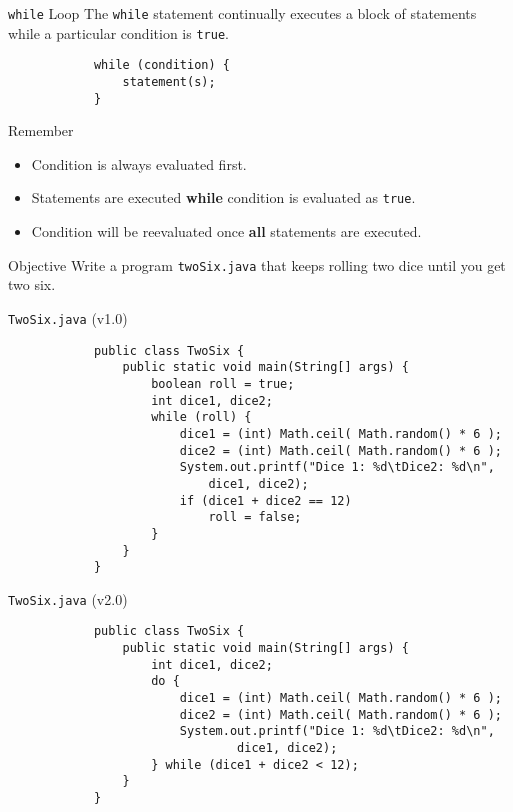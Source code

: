 \documentclass[10pt, compress]{beamer}
\begin{document}
\begin{slide}
	\begin{block}{\texttt{while} Loop}
		The \texttt{while} statement continually executes a block of statements while a particular condition is \texttt{true}.
		\begin{verbatim}
			while (condition) {
			    statement(s);
			}
		\end{verbatim}
	\end{block}
	\begin{block}{Remember}
		\begin{itemize}
			\item[] Condition is always evaluated first.
			\item[] Statements are executed \textbf{while} condition is evaluated as \texttt{true}.
			\item[] Condition will be reevaluated once \textbf{all} statements are executed.
		\end{itemize}
	\end{block}
\end{slide}

\begin{slide}
	\begin{block}{Objective}
		Write a program \texttt{twoSix.java} that keeps rolling two dice until you get two six.
	\end{block}
\end{slide}

\begin{slide}
	\begin{block}{\texttt{TwoSix.java} (v1.0)}
		\begin{verbatim}
			public class TwoSix {
			    public static void main(String[] args) {
			        boolean roll = true;
			        int dice1, dice2;
			        while (roll) {
			            dice1 = (int) Math.ceil( Math.random() * 6 );
			            dice2 = (int) Math.ceil( Math.random() * 6 );
			            System.out.printf("Dice 1: %d\tDice2: %d\n",
			                dice1, dice2);
			            if (dice1 + dice2 == 12)
			                roll = false;
			        }
			    }
			}
		\end{verbatim}
	\end{block}
\end{slide}

\begin{slide}
	\begin{block}{\texttt{TwoSix.java} (v2.0)}
		\begin{verbatim}
			public class TwoSix {
			    public static void main(String[] args) {
			        int dice1, dice2;
			        do {
			            dice1 = (int) Math.ceil( Math.random() * 6 );
			            dice2 = (int) Math.ceil( Math.random() * 6 );
			            System.out.printf("Dice 1: %d\tDice2: %d\n",
			                    dice1, dice2);
			        } while (dice1 + dice2 < 12);
			    }
			}
		\end{verbatim}
	\end{block}
\end{slide}
\end{document}
